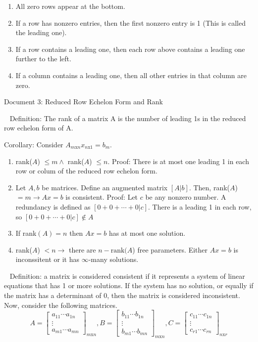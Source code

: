 \documentclass[12pt]{article}
\begin{document}
\begin{enumerate}
\item All zero rows appear at the bottom.
\item If a row has nonzero entries, then the first nonzero entry is 1 (This is called the leading one).
\item If a row contains a leading one, then each row above contains a leading one further to the left.
\item If a column contains a leading one, then all other entries in that column are zero.
\end{enumerate}

\newpage
\begin{center}
Document 3: Reduced Row Echelon Form and Rank
\end{center}

\setlength{\leftskip}{0 in}
$\,\,\,$ Definition: The rank of a matrix A is the number of leading 1s in the reduced row echelon form of A.

Corollary: Consider $A_{m\text{x}n}x_{n\text{x}1}=b_m$.
\begin{enumerate}
\item rank($A$) $\leq m \land$ rank($A$) $\leq n$. Proof: There is at most one leading 1 in each row or colum of the reduced row echelon form.
\item Let $A,b$ be matrices. Define an augmented matrix $\left[\left.A\right|b\right]$. Then, rank($A$)$=m\rightarrow Ax=b$ is consistent. Proof: Let $c$ be any nonzero number. A redundancy is defined as $\left[\left.0+0+\cdots+0\right| c\right]$. There is a leading 1 in each row, so $\left[\left.0+0+\cdots+0\right| c\right]\not\in A$
\item If rank$(A)=n$ then $Ax=b$ has at most one solution.
\item rank($A$) $<n\rightarrow$ there are $n-\text{rank(}A$) free parameters. Either $Ax=b$ is inconssitent or it has $\infty$-many solutions.
\end{enumerate}

$\,\,\,$ Definition: a matrix is considered consistent if it represents a system of linear equations that has 1 or more solutions. If the system has no solution, or equally if the matrix has a determinant of 0, then the matrix is considered inconsistent. Now, consider the following matrices.
$$A=\left[ \begin{matrix}
a_{11}\cdots a_{1n}\\
\vdots\\
a_{m1}\cdots a_{mn}
\end{matrix}\right] _{m\text{x}n},
B=\left[ \begin{matrix}
b_{11}\cdots b_{1n}\\
\vdots\\
b_{m1}\cdots b_{mn}
\end{matrix}\right] _{m\text{x}n},
C=\left[ \begin{matrix}
c_{11}\cdots c_{1n}\\
\vdots\\
c_{r1}\cdots c_{rn}
\end{matrix}\right] _{n\text{x}r}$$
\end{document}
